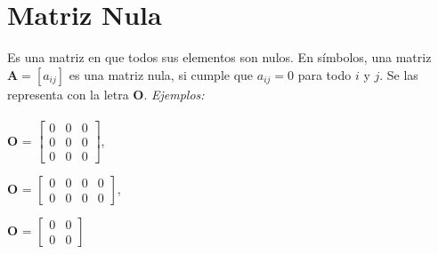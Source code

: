 \documentclass[a4paper,12pt]{report} %
\begin{document}
\section{Matriz Nula}
Es una matriz en que todos sus elementos son nulos. En símbolos, una matriz \(\mathbf{A} = \left[ a_{ij} \right]\) es una matriz nula, si cumple que \(a_{ij} = 0\) para todo \(i\) y \(j\).  
Se las representa con la letra \(\mathbf{O}\).
\newpage
\textit{Ejemplos:} \\ \\
\textbf{O} =
$\begin{bmatrix}
0 & 0 & 0 \\
0 & 0 & 0 \\
0 & 0 & 0
\end{bmatrix}$,\\
\vspace{0.5cm}

\textbf{O} =
$\begin{bmatrix}
0 & 0 & 0 & 0\\
0 & 0 & 0 & 0
\end{bmatrix}$,\\
\vspace{0.5cm}

\textbf{O} =
$\begin{bmatrix}
0 & 0 \\
0 & 0
\end{bmatrix}$\\ \\
\end{document}
